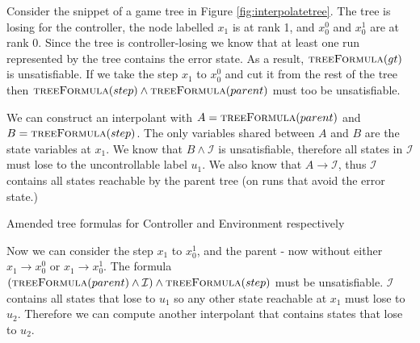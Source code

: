\documentclass{llncs}
\newcommand{\textoverline}[1]{$\overline{\mbox{#1}}$}
\begin{document}
Consider the snippet of a game tree in Figure \ref{fig:interpolatetree}. The
tree is losing for the controller, the node labelled $x_1$ is at rank 1, and
$x_0^0$ and $x_0^1$ are at rank 0. Since the tree is controller-losing we know
that at least one run represented by the tree contains the error state.  As
a result, $\textsc{treeFormula}(gt)$ is unsatisfiable. If we take the step
$x_1$ to $x_0^0$ and cut it from the rest of the tree then
$\textsc{treeFormula}(step) \land \textsc{treeFormula}(parent)$ must too be
unsatisfiable.

We can construct an interpolant with $A = \textsc{treeFormula}(parent)$ and $B
= \textsc{treeFormula}(step)$. The only variables shared between $A$ and $B$
are the state variables at $x_1$. We know that $B \land \mathcal{I}$ is
unsatisfiable, therefore all states in $\mathcal{I}$ must lose to the
uncontrollable label $u_1$. We also know that $A \to \mathcal{I}$, thus
$\mathcal{I}$ contains all states reachable by the parent tree (on runs that
avoid the error state.)

\begin{algorithm}
    \caption{Amended tree formulas for Controller and Environment respectively}
    \label{alg:unboundedTreeFormula}
    \begin{algorithmic}[1]
        \State {}
        \Else
        \State {}
        \EndIf
        \EndFunction
    \end{algorithmic}

    \begin{algorithmic}
        \Function{\textoverline{treeFormula}}{gt}
        \State {}
        \Else
        \State {}
        \EndIf
        \EndFunction
    \end{algorithmic}
\end{algorithm}

Now we can consider the step $x_1$ to $x_0^1$, and the parent - now without
either $x_1 \to x_0^0$ or $x_1 \to x_0^1$. The formula
$(\textsc{treeFormula}(parent) \land \mathcal{I}) \land
\textsc{treeFormula}(step)$ must be unsatisfiable. $\mathcal{I}$ contains all
states that lose to $u_1$ so any other state reachable at $x_1$ must lose to
$u_2$. Therefore we can compute another interpolant that contains states that
lose to $u_2$.
\end{document}

